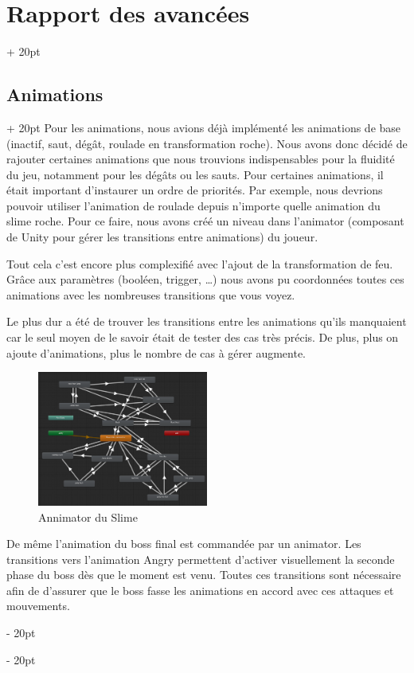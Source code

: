 \documentclass[a4paper, 12pt, twoside]{article}
\newcommand{\ind}[1][20pt]{\advance\leftskip + #1}
\newcommand{\deind}[1][20pt]{\advance\leftskip - #1}
\newenvironment{indt}[2][20pt]{#2 \par \ind[#1]}{\par \deind} %
\begin{document}
\begin{indt}{\section{Rapport des avancées}}
        \newpage

        \begin{indt}{\subsection{Animations}}
            Pour les animations, nous avions déjà implémenté les animations de base (inactif, saut, dégât, roulade en transformation roche). Nous avons donc décidé de rajouter certaines animations que nous trouvions indispensables pour la fluidité du jeu, notamment pour les dégâts ou les sauts. Pour certaines animations, il était important d’instaurer un ordre de priorités. Par exemple, nous devrions pouvoir utiliser l’animation de roulade depuis n’importe quelle animation du slime roche.  Pour ce faire, nous avons créé un niveau dans l’animator (composant de Unity pour gérer les transitions entre animations) du joueur.

            Tout cela c’est encore plus complexifié avec l’ajout de la transformation de feu. Grâce aux paramètres (booléen, trigger, …) nous avons pu coordonnées toutes ces animations avec les nombreuses transitions que vous voyez.

            Le plus dur a été de trouver les transitions entre les animations qu’ils manquaient car le seul moyen de le savoir était de tester des cas très précis. De plus, plus on ajoute d’animations, plus le nombre de cas à gérer augmente.

            \begin{figure}[h]
                \centering
                \includegraphics[width=0.5\textwidth]{Annim1.png}
                \caption{Annimator du Slime}
                \label{fig:mesh1}
            \end{figure}

            De même l’animation du boss final est commandée par un animator. Les transitions vers l’animation Angry permettent d’activer visuellement la seconde phase du boss dès que le moment est venu. Toutes ces transitions sont nécessaire afin de d’assurer que le boss fasse les animations en accord avec ces attaques et mouvements.


\end{indt}
\end{indt}
\end{document}
